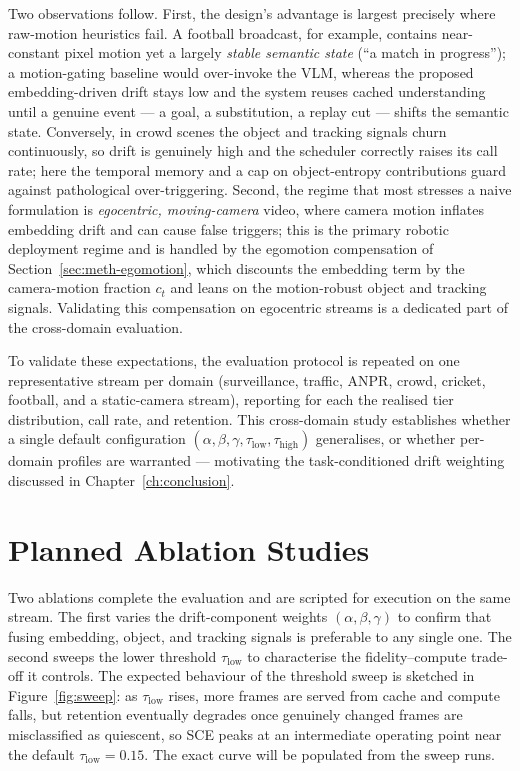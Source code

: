 Two observations follow. First, the design's advantage is largest precisely
where raw-motion heuristics fail. A football broadcast, for example, contains
near-constant pixel motion yet a largely \emph{stable semantic state} (``a
match in progress''); a motion-gating baseline would over-invoke the VLM,
whereas the proposed embedding-driven drift stays low and the system reuses
cached understanding until a genuine event --- a goal, a substitution, a
replay cut --- shifts the semantic state. Conversely, in crowd scenes the
object and tracking signals churn continuously, so drift is genuinely high and
the scheduler correctly raises its call rate; here the temporal memory and a
cap on object-entropy contributions guard against pathological
over-triggering. Second, the regime that most stresses a naive formulation is
\emph{egocentric, moving-camera} video, where camera motion inflates embedding
drift and can cause false triggers; this is the primary robotic deployment
regime and is handled by the egomotion compensation of
Section~\ref{sec:meth-egomotion}, which discounts the embedding term by the
camera-motion fraction $c_t$ and leans on the motion-robust object and
tracking signals. Validating this compensation on egocentric streams is a
dedicated part of the cross-domain evaluation.

To validate these expectations, the evaluation protocol is repeated on one
representative stream per domain (surveillance, traffic, ANPR, crowd, cricket,
football, and a static-camera stream), reporting for each the realised tier
distribution, call rate, and retention. This cross-domain study establishes
whether a single default configuration $(\alpha,\beta,\gamma,
\tau_{\text{low}},\tau_{\text{high}})$ generalises, or whether per-domain
profiles are warranted --- motivating the task-conditioned drift weighting
discussed in Chapter~\ref{ch:conclusion}.

\section{Planned Ablation Studies}
\label{sec:exp-ablation}

Two ablations complete the evaluation and are scripted for execution on the
same stream. The first varies the drift-component weights
$(\alpha,\beta,\gamma)$ to confirm that fusing embedding, object, and tracking
signals is preferable to any single one. The second sweeps the lower threshold
$\tau_{\text{low}}$ to characterise the fidelity--compute trade-off it
controls. The expected behaviour of the threshold sweep is sketched in
Figure~\ref{fig:sweep}: as $\tau_{\text{low}}$ rises, more frames are served
from cache and compute falls, but retention eventually degrades once genuinely
changed frames are misclassified as quiescent, so SCE peaks at an intermediate
operating point near the default $\tau_{\text{low}}=0.15$. The exact curve
will be populated from the sweep runs.

